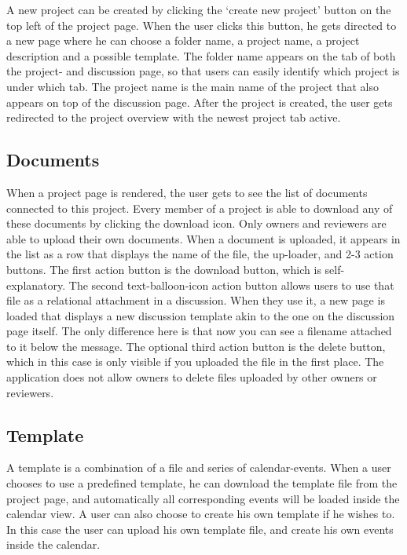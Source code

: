 A new project can be created by clicking the `create new project' button on the top left of the project page. When the user clicks this button,
he gets directed to a new page where he can choose a folder name, a project name, a project description and a possible template. The folder name
appears on the tab of both the project- and discussion page, so that users can easily identify which project is under which tab. The project
name is the main name of the project that also appears on top of the discussion page. After the project is created, the user gets redirected
to the project overview with the newest project tab active.

\subsection{Documents}

When a project page is rendered, the user gets to see the list of documents connected to this project. Every member of a project is able to download
any of these documents by clicking the download icon. Only owners and reviewers are able to upload their own documents. When a document is uploaded,
it appears in the list as a row that displays the name of the file, the up-loader, and 2-3 action buttons. The first action button is the download 
button, which is self-explanatory. The second text-balloon-icon action button allows users to use that file as a relational attachment in a discussion.
When they use it, a new page is loaded that displays a new discussion template akin to the one on the discussion page itself. The only difference here
is that now you can see a filename attached to it below the message. The optional third action button is the delete button, which in this case is
only visible if you uploaded the file in the first place. The application does not allow owners to delete files uploaded by other owners or reviewers.

\subsection{Template}

A template is a combination of a file and series of calendar-events. When a user chooses to use a predefined template, he can download the template file
from the project page, and automatically all corresponding events will be loaded inside the calendar view. A user can also choose to create his own 
template if he wishes to. In this case the user can upload his own template file, and create his own events inside the calendar.

